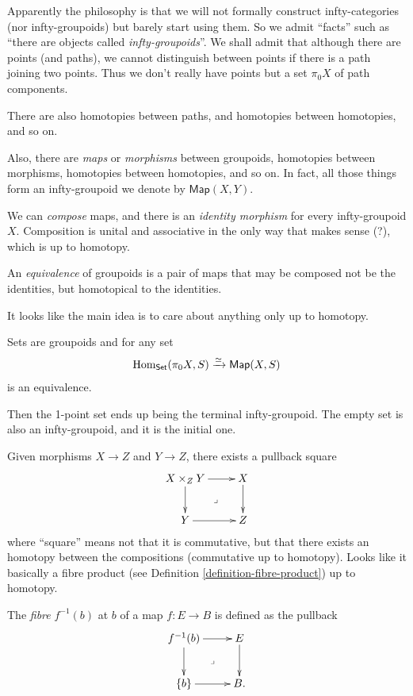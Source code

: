 Apparently the philosophy is that
we will not formally construct
infty-categories
(nor infty-groupoids) but
barely start using them.
So we admit ``facts'' such as
``there are objects called
{\it infty-groupoids}''.
We shall admit that although there are points
(and paths),
we cannot distinguish between points if there
is
a path joining two points. Thus we don't
really have points
but a set $\pi_0X$ of path components.

There are also homotopies between
paths, and homotopies between homotopies, and
so on.

Also, there are {\it maps} or {\it morphisms}
between groupoids,
homotopies between morphisms, homotopies
between homotopies,
and so on. In fact, all those things form an
infty-groupoid
we denote by $\mathsf{Map}(X,Y)$.

We can {\it compose} maps, and there is
an {\it identity morphism} for every
infty-groupoid $X$.
Composition is unital and associative in the
only
way that makes sense (?), which is up to
homotopy.

\begin{definition}
\label{definition-equivalence}
An {\it equivalence} of groupoids is a pair
of maps
that may be composed not be the identities,
but homotopical to the identities.
\end{definition}

It looks like the main idea
is to care about anything only up to
homotopy.

\medskip\noindent
Sets are groupoids and for any set
$$
\mathop{\mathrm{Hom}}\nolimits_{\mathsf{Set}}(\pi_0X,S)
\xrightarrow{\simeq
}\mathsf{Map}(X,S)
$$
is an equivalence.

Then the 1-point set ends up being
the terminal infty-groupoid. The empty set
is also an infty-groupoid, and it is
the initial one.

\medskip\noindent
Given morphisms $X \to Z$ and $Y \to Z$,
there exists a pullback square
$$
\xymatrix{
X\times_Z
Y\ar[r]\ar[d]\ar@{}[dr]|-{\lrcorner}&X\ar[d]
\\
Y\ar[r]&Z
}
$$
where ``square'' means not that it is
commutative,
but that there exists an homotopy between
the compositions (commutative up to
homotopy).
Looks like it basically a fibre product
(see Definition
\ref{definition-fibre-product})
up to homotopy.

The {\it fibre} $f^{-1}(b)$ at $b$ of a map
$f:E\to B$ is defined as the pullback
$$
\xymatrix{
f^{-1}(b)\ar[r]\ar[d]\ar@{}[dr]|-{\lrcorner}&
E\ar[d]\\
\{b\}\ar[r]&B.
}
$$

